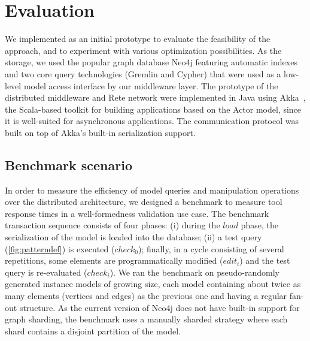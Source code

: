 \chapter{Evaluation}
\label{sec:evaluation}


We implemented \incqueryD{} as an initial prototype to evaluate the feasibility of the approach, and to experiment with various optimization possibilities. As the storage, we used the popular graph database Neo4j \cite{neo4j} featuring automatic indexes and two core query technologies (Gremlin and Cypher) that were used as a low-level model access interface by our middleware layer. %
The prototype of the distributed middleware and Rete network were implemented in Java using Akka~\cite{akka}, the Scala-based toolkit for building applications based on the Actor model, since it is well-suited for asynchronous applications. The communication protocol was built on top of Akka's built-in serialization support.






\section{Benchmark scenario}

\label{benchmark}
In order to measure the efficiency of model queries and manipulation operations over the distributed architecture, we designed a benchmark to measure tool response times in a well-formedness validation use case. The benchmark transaction sequence consists of four phases: (i) during the $load$ phase, the serialization of the model is loaded into the database; (ii) a test query (\autoref{fig:patterndef}) is executed ($check_0$); finally, in a cycle consisting of several repetitions, some elements are programmatically modified ($edit_i$) and the test query is re-evaluated ($check_i$). We ran the benchmark on pseudo-randomly generated instance models of growing size, each model containing about twice as many elements (vertices and edges) as the previous one and having a regular fan-out structure. As the current version of Neo4j does not have built-in support for graph sharding, the benchmark uses a manually sharded strategy where each shard contains a disjoint partition of the model.



